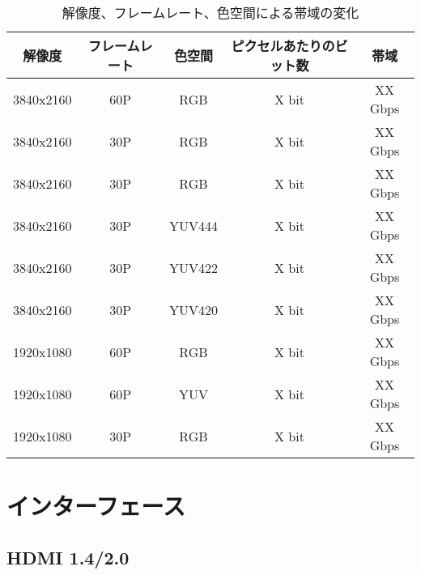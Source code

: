 \begin{table}[htbp]
  \caption{解像度、フレームレート、色空間による帯域の変化}
  \label{tb:video-bandwidth}
  \begin{center}
  \begin{tabular}{c|c|c|c|c}
    \hline
    解像度     & フレームレート & 色空間 & ピクセルあたりのビット数 & 帯域\\\hline\hline
    3840x2160 & 60P          & RGB    & X bit               & XX Gbps\\\hline
    3840x2160 & 30P          & RGB    & X bit               & XX Gbps\\\hline
    3840x2160 & 30P          & RGB    & X bit               & XX Gbps\\\hline
    3840x2160 & 30P          & YUV444 & X bit               & XX Gbps\\\hline
    3840x2160 & 30P          & YUV422 & X bit               & XX Gbps\\\hline
    3840x2160 & 30P          & YUV420 & X bit               & XX Gbps\\\hline
    1920x1080 & 60P          & RGB    & X bit               & XX Gbps\\\hline
    1920x1080 & 60P          & YUV    & X bit               & XX Gbps\\\hline
    1920x1080 & 30P          & RGB    & X bit               & XX Gbps\\\hline
  \end{tabular}\end{center}
\end{table}

\section{インターフェース}
\subsection{HDMI 1.4/2.0}

